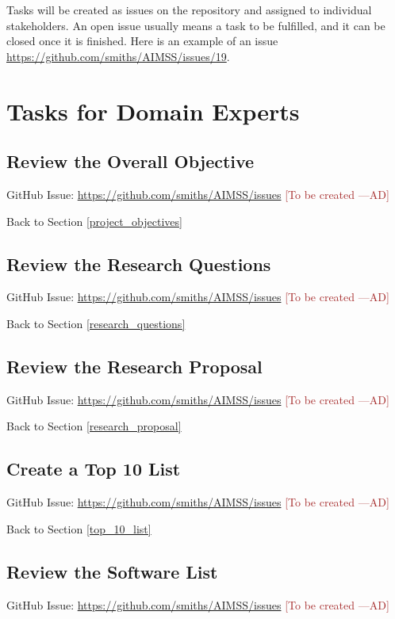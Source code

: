 \documentclass[12pt]{article}
\newcommand{\authornote}[3]{\textcolor{#1}{[#3 ---#2]}}
\newcommand{\authornote}[3]{}
\newcommand{\ad}[1]{\authornote{brown}{AD}{#1}} %
\begin{document}
Tasks will be created as issues on the repository and assigned to individual
stakeholders. An open issue usually means a task to be fulfilled, and it can be
closed once it is finished. Here is an example of an issue
\href{https://github.com/smiths/AIMSS/issues/19}{https://github.com/smiths/AIMSS/issues/19}.

\section{Tasks for Domain Experts}
\label{tasks_domain_experts}

\subsection{Review the Overall Objective}
\label{task_overall_objective}
GitHub Issue:
\href{https://github.com/smiths/AIMSS/issues}{https://github.com/smiths/AIMSS/issues}
\ad{To be created}

\noindent Back to Section \ref{project_objectives}

\subsection{Review the Research Questions}
\label{task_research_questions}
GitHub Issue:
\href{https://github.com/smiths/AIMSS/issues}{https://github.com/smiths/AIMSS/issues}
\ad{To be created}

\noindent Back to Section \ref{research_questions}

\subsection{Review the Research Proposal}
\label{task_research_proposal}
GitHub Issue:
\href{https://github.com/smiths/AIMSS/issues}{https://github.com/smiths/AIMSS/issues}
\ad{To be created}

\noindent Back to Section \ref{research_proposal}

\subsection{Create a Top 10 List}
\label{task_top_10_list}
GitHub Issue:
\href{https://github.com/smiths/AIMSS/issues}{https://github.com/smiths/AIMSS/issues}
\ad{To be created}

\noindent Back to Section \ref{top_10_list}

\subsection{Review the Software List}
\label{task_software_list}
GitHub Issue:
\href{https://github.com/smiths/AIMSS/issues}{https://github.com/smiths/AIMSS/issues}
\ad{To be created}
\end{document}
